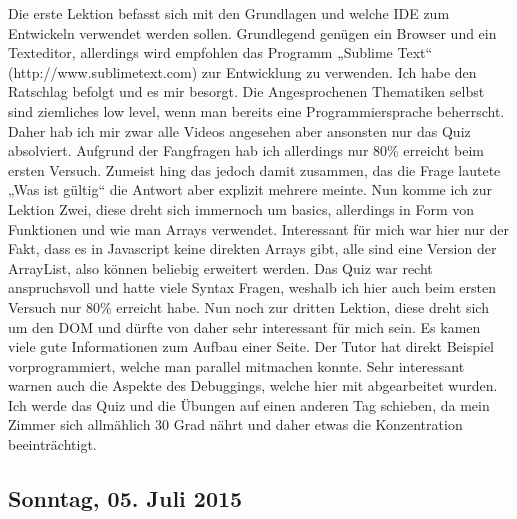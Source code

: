 \documentclass[12pt,a4paper,bibliography=totocnumbered,listof=totocnumbered]{scrartcl}
\begin{document}
Die erste Lektion befasst sich mit den Grundlagen und welche IDE zum Entwickeln verwendet werden sollen. Grundlegend genügen ein Browser und ein Texteditor, allerdings wird empfohlen das Programm „Sublime Text“ (http://www.sublimetext.com) zur Entwicklung zu verwenden. 
Ich habe den Ratschlag befolgt und es mir besorgt. 
Die Angesprochenen Thematiken selbst sind ziemliches low level, wenn man bereits eine Programmiersprache beherrscht. Daher hab ich mir zwar alle Videos angesehen aber ansonsten nur das Quiz absolviert. 
Aufgrund der Fangfragen hab ich allerdings nur 80\% erreicht beim ersten Versuch. Zumeist hing das jedoch damit zusammen, das die Frage lautete „Was ist gültig“ die Antwort aber explizit mehrere meinte. 
Nun komme ich zur Lektion Zwei, diese dreht sich immernoch um basics, allerdings in Form von Funktionen und wie man Arrays verwendet. Interessant für mich war hier nur der Fakt, dass es in Javascript keine direkten Arrays gibt, alle sind eine Version der ArrayList, also können beliebig erweitert werden. 
Das Quiz war recht anspruchsvoll und hatte viele Syntax Fragen, weshalb ich hier auch beim ersten Versuch nur 80\% erreicht habe. 
Nun noch zur dritten Lektion, diese dreht sich um den DOM und dürfte von daher sehr interessant für mich sein.  Es kamen viele gute Informationen zum Aufbau einer Seite. Der Tutor hat direkt Beispiel vorprogrammiert, welche man parallel mitmachen konnte. Sehr interessant warnen auch die Aspekte des Debuggings, welche hier mit abgearbeitet wurden.  Ich werde das Quiz und die Übungen auf einen anderen Tag schieben, da mein Zimmer sich allmählich 30 Grad nährt und daher etwas die Konzentration beeinträchtigt.

\subsection{Sonntag, 05. Juli 2015}
\end{document}

